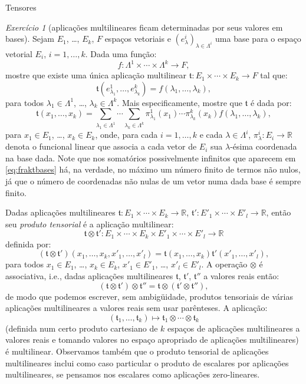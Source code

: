 \documentclass[oneside,11pt]{amsart}
\newcommand{\R}{\mathds R}
\theoremstyle{remark}\newtheorem{exercise}{Exercício}[section]
\theoremstyle{plain}\newtheorem{teo}{Teorema}[section]
\theoremstyle{plain}\newtheorem{lem}[teo]{Lema}
\theoremstyle{plain}\newtheorem{prop}[teo]{Proposição}
\theoremstyle{definition}\newtheorem{defin}[teo]{Definição}
\theoremstyle{remark}\newtheorem{rem}[teo]{Observação}
\theoremstyle{definition}\newtheorem{example}[teo]{Exemplo}
\numberwithin{equation}{section}
\begin{document}
\begin{section}{Tensores}
\begin{exercise}[aplicações multilineares ficam determinadas por seus valores em bases]\label{exe:multlinbase}
Sejam $E_1$, \dots, $E_k$, $F$ espaços vetoriais e $(e^i_\lambda)_{\lambda\in\Lambda^i}$ uma base para o espaço vetorial $E_i$, $i=1,\ldots,k$.
Dada uma função:
\[f:\Lambda^1\times\cdots\times\Lambda^k\longrightarrow F,\]
mostre que existe uma única aplicação multilinear $\mathfrak t:E_1\times\cdots\times E_k\to F$
tal que:
\[\mathfrak t(e^1_{\lambda_1},\ldots,e^k_{\lambda_k})=f(\lambda_1,\ldots,\lambda_k),\]
para todos $\lambda_1\in\Lambda^1$, \dots, $\lambda_k\in\Lambda^k$. Mais especificamente, mostre que $\mathfrak t$ é dada por:
\begin{equation}\label{eq:fraktbases}
\mathfrak t(x_1,\ldots,x_k)=\sum_{\lambda_1\in\Lambda^1}\cdots\sum_{\lambda_k\in\Lambda^k}\pi^1_{\lambda_1}(x_1)\cdots\pi^k_{\lambda_k}(x_k)f(\lambda_1,\ldots,\lambda_k),
\end{equation}
para $x_1\in E_1$, \dots, $x_k\in E_k$,
onde, para cada $i=1,\ldots,k$ e cada $\lambda\in\Lambda^i$, $\pi^i_\lambda:E_i\to\R$ denota o funcional linear que associa a cada vetor de $E_i$ sua $\lambda$-ésima
coordenada na base dada. Note que nos somatórios possivelmente infinitos que aparecem em \eqref{eq:fraktbases} há, na verdade, no máximo um número finito de termos
não nulos, já que o número de coordenadas não nulas de um vetor numa dada base é sempre finito.
\end{exercise}

Dadas aplicações multilineares $\mathfrak t:E_1\times\cdots\times E_k\to\R$, $\mathfrak t':E'_1\times\cdots\times E'_l\to\R$, então seu {\em produto tensorial\/}
é a aplicação multilinear:
\[\mathfrak t\otimes\mathfrak t':E_1\times\cdots\times E_k\times E'_1\times\cdots\times E'_l\longrightarrow\R\]
definida por:
\[(\mathfrak t\otimes\mathfrak t')(x_1,\ldots,x_k,x'_1,\ldots,x'_l)=\mathfrak t(x_1,\ldots,x_k)\mathfrak t'(x'_1,\ldots,x'_l),\]
para todos $x_1\in E_1$, \dots, $x_k\in E_k$, $x'_1\in E'_1$, \dots, $x'_l\in E'_l$. A operação $\otimes$ é associativa, i.e.,
dadas aplicações multilineares $\mathfrak t$, $\mathfrak t'$, $\mathfrak t''$ a valores reais então:
\[(\mathfrak t\otimes\mathfrak t')\otimes\mathfrak t''=\mathfrak t\otimes(\mathfrak t'\otimes\mathfrak t''),\]
de modo que podemos escrever, sem ambigüidade, produtos tensoriais de várias aplicações multilineares a valores reais sem usar parênteses.
A aplicação:
\[(\mathfrak t_1,\ldots,\mathfrak t_k)\longmapsto\mathfrak t_1\otimes\cdots\otimes\mathfrak t_k\]
(definida num certo produto cartesiano de $k$ espaços de aplicações multilineares a valores reais e tomando valores no espaço apropriado
de aplicações multilineares) é multilinear. Observamos também que o produto tensorial de aplicações multilineares inclui como caso particular
o produto de escalares por aplicações multilineares, se pensamos nos escalares como aplicações zero-lineares.


\end{section}
\end{document}
